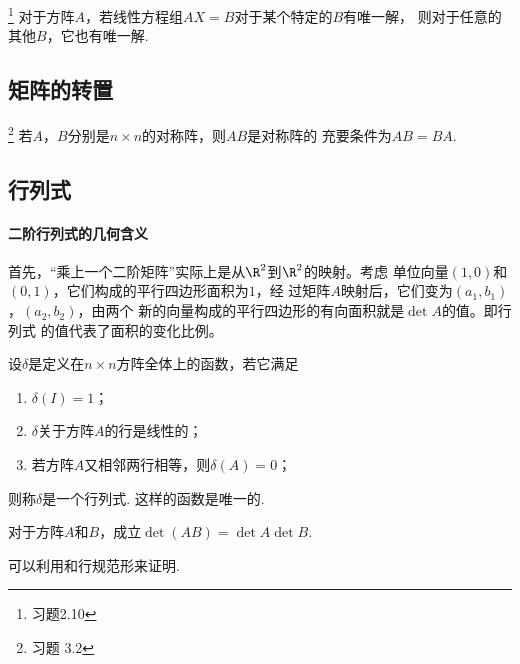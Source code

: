   \begin{pos}\footnote{习题2.10}
    对于方阵$A$，若线性方程组$AX=B$对于某个特定的$B$有唯一解，
    则对于任意的其他$B$，它也有唯一解.
  \end{pos}

\subsection{矩阵的转置}
   \begin{pos}\footnote{习题 3.2}
     若$A$，$B$分别是$n\times n$的对称阵，则$AB$是对称阵的
     充要条件为$AB=BA$.
   \end{pos}

\subsection{行列式}

  \paragraph{二阶行列式的几何含义}
    首先，“乘上一个二阶矩阵”实际上是从$\R^2$到$\R^2$的映射。考虑
    单位向量$(1,0)$和$(0,1)$，它们构成的平行四边形面积为$1$，经
    过矩阵$A$映射后，它们变为$(a_1,b_1)$，$(a_2,b_2)$，由两个
    新的向量构成的平行四边形的有向面积就是$\det A$的值。即行列式
    的值代表了面积的变化比例。

  \begin{thm}
    设$\delta$是定义在$n\times n$方阵全体上的函数，若它满足
    \begin{enumerate}
      \item $\delta(I)=1$；
      \item $\delta$关于方阵$A$的行是线性的；
      \item 若方阵$A$又相邻两行相等，则$\delta(A)=0$；
    \end{enumerate}
    则称$\delta$是一个行列式. 这样的函数是唯一的.
  \end{thm}

  \begin{thm}
    对于方阵$A$和$B$，成立$\det(AB)=\det A\det B$.
  \end{thm}
  \proof
    可以利用和行规范形来证明.

